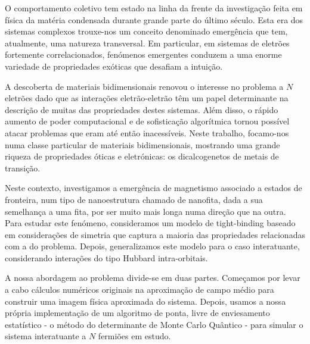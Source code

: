 \begin{resumo}

O comportamento coletivo tem estado na linha da frente da investigação feita em física da matéria condensada durante grande parte do último século.
Esta era dos sistemas complexos trouxe-nos um conceito denominado emergência que tem, atualmente, uma natureza transversal.
Em particular, em sistemas de eletrões fortemente correlacionados, fenómenos emergentes conduzem a uma enorme variedade de propriedades exóticas que desafiam a intuição.

A descoberta de materiais bidimensionais renovou o interesse no problema a $N$ eletrões dado que as interações eletrão-eletrão têm um papel determinante na descrição de muitas das propriedades destes sistemas.
Além disso, o rápido aumento de poder computacional e de sofisticação algorítmica tornou possível atacar problemas que eram até então inacessíveis.
Neste trabalho, focamo-nos numa classe particular de materiais bidimensionais, mostrando uma grande riqueza de propriedades óticas e eletrónicas: os dicalcogenetos de metais de transição.

Neste contexto, investigamos a emergência de magnetismo associado a estados de fronteira, num tipo de nanoestrutura chamado de nanofita, dada a sua semelhança a uma fita, por ser muito mais longa numa direção que na outra.
Para estudar este fenómeno, consideramos um modelo de tight-binding baseado em considerações de simetria que captura a maioria das propriedades relacionadas com a  do problema.
Depois, generalizamos este modelo para o caso interatuante, considerando interações do tipo Hubbard intra-orbitais.

A nossa abordagem ao problema divide-se em duas partes.
Começamos por levar a cabo cálculos numéricos originais na aproximação de campo médio para construir uma imagem física aproximada do sistema.
Depois, usamos a nossa própria implementação de um algoritmo de ponta, livre de enviesamento estatístico - o método do determinante de Monte Carlo Quântico - para simular o sistema interatuante a $N$ fermiões em estudo.
\end{resumo}
\vspace{-2.5cm}